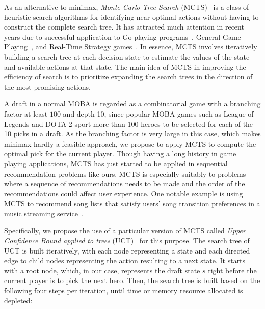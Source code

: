 As an alternative to minimax, \textit{Monte Carlo Tree Search} (MCTS)~\cite{coulom2006efficient,kocsis2006bandit,nguyen2014bootstrapping} is a class of heuristic search algorithms for identifying near-optimal actions without having to construct the complete search tree. It has attracted much attention in recent years due to successful application to Go-playing programs~\cite{silver2016mastering,silver2017mastering}, General Game Playing~\cite{finnsson2008simulation}, and Real-Time Strategy games~\cite{balla2009uct}. In essence, MCTS involves iteratively building a search tree at each decision state to estimate the values of the state and available actions at that state. The main idea of MCTS in improving the efficiency of search is to prioritize expanding the search trees in the direction of the most promising actions.


A draft in a normal MOBA is regarded as a combinatorial game with a branching factor at least $100$ and depth 10, since popular MOBA games such as League of Legends and DOTA 2 sport more than 100 heroes to be selected for each of the 10 picks in a draft. As the branching factor is very large in this case, which makes minimax hardly a feasible approach, we propose to apply MCTS to compute the optimal pick for the current player. Though having a long history in game playing applications, MCTS has just started to be applied in sequential recommendation problems like ours. MCTS is especially suitably to problems where a sequence of recommendations needs to be made and the order of the recommendations could affect user experience. One notable example is using MCTS to recommend song lists that satisfy users' song transition preferences in a music streaming service~\cite{}.








Specifically, we propose the use of a particular version of MCTS called \textit{Upper Confidence Bound applied to trees} (UCT)~\cite{kocsis2006bandit} for this purpose. The search tree of UCT is built iteratively, with each node representing a state and each directed edge to child nodes representing the action resulting to a next state. It starts with a root node, which, in our case, represents the draft state $s$ right before the current player is to pick the next hero. Then, the search tree is built based on the following four steps per iteration, until time or memory resource allocated is depleted:

